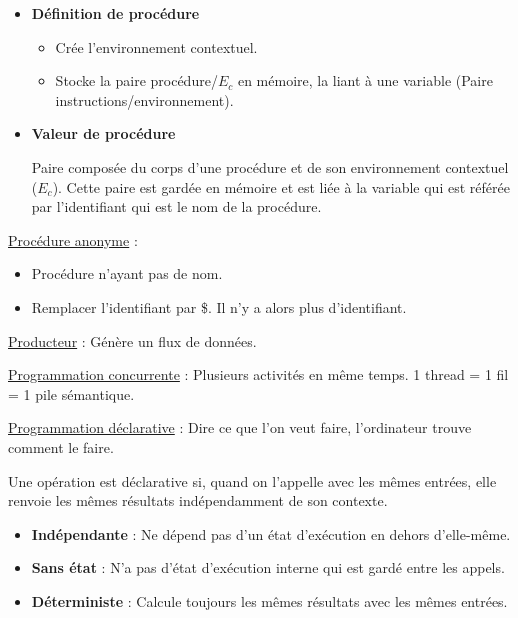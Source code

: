 \documentclass[fr,license=none]{../../../eplsummary}
\begin{document}
\begin{flushleft}
\begin{itemize}
\begin{itemize} [label=\textbullet, font=\MEDIUM]
\item Exécute le corps de procédure avec ce nouvel \textcolor{miorangerouge}{E}.
\end{itemize}



\item \textbf{Définition de procédure}
\begin{itemize} [label=\textbullet, font=\MEDIUM]
\item Crée l'environnement contextuel.
\item Stocke la paire procédure/\textcolor{miorangerouge}{$E_c$} en mémoire, la liant à une variable (Paire instructions/environnement).
\end{itemize}



\item \textbf{Valeur de procédure}

Paire composée du corps d'une procédure et de son environnement contextuel (\textcolor{miorangerouge}{$E_{c}$}). Cette paire est gardée en mémoire et est liée à la variable qui est référée par l'identifiant qui est le nom de la procédure.
\end{itemize}\bigbreak





\textcolor{mauvedef}{\underline{Procédure anonyme}} :
\begin{itemize}
\item Procédure n'ayant pas de nom.
\item Remplacer l'identifiant par \textcolor{miorangerouge}{\$}. Il n'y a alors plus d'identifiant.
\end{itemize}\bigbreak


\textcolor{mauvedef}{\underline{Producteur}} : Génère un flux de données.  \bigbreak

\textcolor{mauvedef}{\underline{Programmation concurrente}} : Plusieurs activités en même temps. 1 thread = 1 fil = 1 pile sémantique.  \bigbreak

\textcolor{mauvedef}{\underline{Programmation déclarative}} : Dire ce que l'on veut faire, l'ordinateur trouve comment le faire.  

Une opération est déclarative si, quand on l'appelle avec les mêmes entrées, elle renvoie les mêmes résultats indépendamment de son contexte.
\begin{itemize}
\item \textbf{Indépendante} : Ne dépend pas d'un état d'exécution en dehors d'elle-même.
\item \textbf{Sans état} : N'a pas d'état d'exécution interne qui est gardé entre les appels.
\item \textbf{Déterministe} : Calcule toujours les mêmes résultats avec les mêmes entrées.
\end{itemize}\bigbreak




\end{flushleft}
\end{document}
